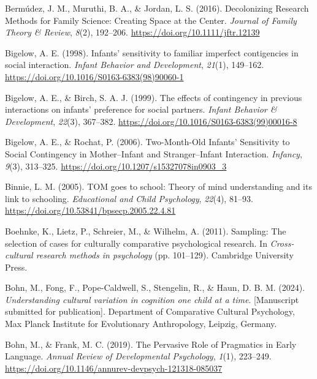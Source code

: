 \documentclass[
]{scrbook}
\newlength{\cslhangindent}
\newenvironment{CSLReferences}[2] %
 {\begin{list}{}{%
  \setlength{\itemindent}{0pt}
  \setlength{\leftmargin}{0pt}
  \setlength{\parsep}{0pt}
  \ifodd #1
   \setlength{\leftmargin}{\cslhangindent}
   \setlength{\itemindent}{-1\cslhangindent}
  \fi
  \setlength{\itemsep}{#2\baselineskip}}}
 {\end{list}}
\begin{document}
\begin{CSLReferences}{1}{0}
Bermúdez, J. M., Muruthi, B. A., \& Jordan, L. S. (2016). Decolonizing {Research Methods} for {Family Science}: {Creating Space} at the {Center}. \emph{Journal of Family Theory \& Review}, \emph{8}(2), 192--206. \url{https://doi.org/10.1111/jftr.12139}

Bigelow, A. E. (1998). Infants' sensitivity to familiar imperfect contigencies in social interaction. \emph{Infant Behavior and Development}, \emph{21}(1), 149--162. \url{https://doi.org/10.1016/S0163-6383(98)90060-1}

Bigelow, A. E., \& Birch, S. A. J. (1999). The effects of contingency in previous interactions on infants' preference for social partners. \emph{Infant Behavior \& Development}, \emph{22}(3), 367--382. \url{https://doi.org/10.1016/S0163-6383(99)00016-8}

Bigelow, A. E., \& Rochat, P. (2006). Two-{Month}-{Old Infants}' {Sensitivity} to {Social Contingency} in {Mother}--{Infant} and {Stranger}--{Infant Interaction}. \emph{Infancy}, \emph{9}(3), 313--325. \url{https://doi.org/10.1207/s15327078in0903_3}

Binnie, L. M. (2005). {TOM} goes to school: {Theory} of mind understanding and its link to schooling. \emph{Educational and Child Psychology}, \emph{22}(4), 81--93. \url{https://doi.org/10.53841/bpsecp.2005.22.4.81}

Boehnke, K., Lietz, P., Schreier, M., \& Wilhelm, A. (2011). Sampling: {The} selection of cases for culturally comparative psychological research. In \emph{Cross-cultural research methods in psychology} (pp. 101--129). Cambridge University Press.

Bohn, M., Fong, F., Pope-Caldwell, S., Stengelin, R., \& Haun, D. B. M. (2024). \emph{Understanding cultural variation in cognition one child at a time}. {[}Manuscript submitted for publication{]}. Department of Comparative Cultural Psychology, Max Planck Institute for Evolutionary Anthropology, Leipzig, Germany.

Bohn, M., \& Frank, M. C. (2019). The {Pervasive Role} of {Pragmatics} in {Early Language}. \emph{Annual Review of Developmental Psychology}, \emph{1}(1), 223--249. \url{https://doi.org/10.1146/annurev-devpsych-121318-085037}


\end{CSLReferences}
\end{document}

